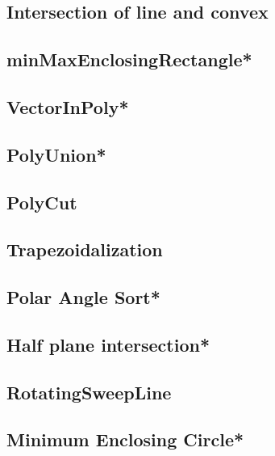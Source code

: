 \subsection{Intersection of line and convex} %

\subsection{minMaxEnclosingRectangle*} %

\subsection{VectorInPoly*} %

\subsection{PolyUnion*} %

\subsection{PolyCut}

\subsection{Trapezoidalization} %

\subsection{Polar Angle Sort*} %

\subsection{Half plane intersection*} %

\subsection{RotatingSweepLine}

\subsection{Minimum Enclosing Circle*} %

